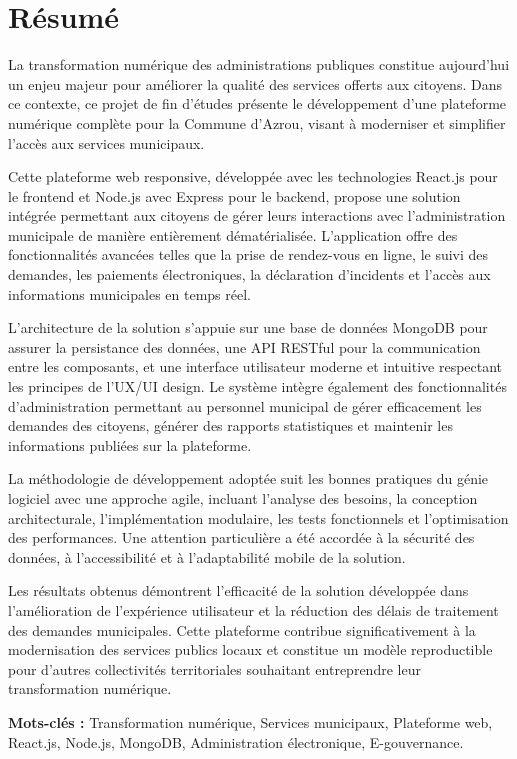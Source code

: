 \chapter*{Résumé}

La transformation numérique des administrations publiques constitue aujourd'hui un enjeu majeur pour améliorer la qualité des services offerts aux citoyens. Dans ce contexte, ce projet de fin d'études présente le développement d'une plateforme numérique complète pour la Commune d'Azrou, visant à moderniser et simplifier l'accès aux services municipaux.

Cette plateforme web responsive, développée avec les technologies React.js pour le frontend et Node.js avec Express pour le backend, propose une solution intégrée permettant aux citoyens de gérer leurs interactions avec l'administration municipale de manière entièrement dématérialisée. L'application offre des fonctionnalités avancées telles que la prise de rendez-vous en ligne, le suivi des demandes, les paiements électroniques, la déclaration d'incidents et l'accès aux informations municipales en temps réel.

L'architecture de la solution s'appuie sur une base de données MongoDB pour assurer la persistance des données, une API RESTful pour la communication entre les composants, et une interface utilisateur moderne et intuitive respectant les principes de l'UX/UI design. Le système intègre également des fonctionnalités d'administration permettant au personnel municipal de gérer efficacement les demandes des citoyens, générer des rapports statistiques et maintenir les informations publiées sur la plateforme.

La méthodologie de développement adoptée suit les bonnes pratiques du génie logiciel avec une approche agile, incluant l'analyse des besoins, la conception architecturale, l'implémentation modulaire, les tests fonctionnels et l'optimisation des performances. Une attention particulière a été accordée à la sécurité des données, à l'accessibilité et à l'adaptabilité mobile de la solution.

Les résultats obtenus démontrent l'efficacité de la solution développée dans l'amélioration de l'expérience utilisateur et la réduction des délais de traitement des demandes municipales. Cette plateforme contribue significativement à la modernisation des services publics locaux et constitue un modèle reproductible pour d'autres collectivités territoriales souhaitant entreprendre leur transformation numérique.

\textbf{Mots-clés :} Transformation numérique, Services municipaux, Plateforme web, React.js, Node.js, MongoDB, Administration électronique, E-gouvernance.
